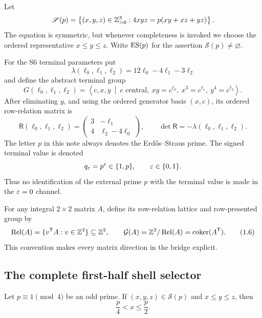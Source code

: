 Let
\[
 \mathscr S(p)=
 \left\{(x,y,z)\in\mathbb Z_{>0}^3:
 4xyz=p(xy+xz+yz)\right\}.
\]
The equation is symmetric, but whenever completeness is invoked we choose the
ordered representative \(x\leq y\leq z\).
Write \(\operatorname{ES}(p)\) for the assertion \(\mathscr S(p)\neq\varnothing\).

For the S6 terminal parameters put
\begin{equation}
 \lambda(\ell_0,\ell_1,\ell_2)
 =12\ell_0-4\ell_1-3\ell_2                 \tag{1.3}
\end{equation}
and define the abstract terminal group
\begin{equation}
 G(\ell_0,\ell_1,\ell_2)=
 \left\langle c,x,y\ \middle|\
 c\text{ central},\ xy=c^{\ell_0},\
 x^3=c^{\ell_1},\ y^4=c^{\ell_2}
 \right\rangle .                            \tag{1.4}
\end{equation}
After eliminating \(y\), and using the ordered generator basis \((x,c)\),
its ordered row-relation matrix is
\begin{equation}
 \mathsf R(\ell_0,\ell_1,\ell_2)=
 \begin{pmatrix}
 3&-\ell_1\\
 4&\ell_2-4\ell_0
 \end{pmatrix},
 \qquad
 \det\mathsf R=-\lambda(\ell_0,\ell_1,\ell_2).              \tag{1.5}
\end{equation}
The letter \(p\) in this note always denotes the Erd\H{o}s--Straus prime.
The signed terminal value is denoted
\[
 q_\varepsilon=p^\varepsilon\in\{1,p\},\qquad \varepsilon\in\{0,1\}.
\]
Thus no identification of the external prime \(p\) with the terminal value
is made in the \(\varepsilon=0\) channel.

For any integral \(2\times2\) matrix \(A\), define its row-relation lattice
and row-presented group by
\[
 \operatorname{Rel}(A)=\{v^{\mathsf T}A:v\in\mathbb Z^2\}\subseteq\mathbb Z^2,
 \qquad \mathcal G(A)=\mathbb Z^2/\operatorname{Rel}(A)=\operatorname{coker}(A^{\mathsf T}).    \tag{1.6}
\]
This convention makes every matrix direction in the bridge explicit.

\subsection{The complete first-half shell selector}

\begin{lemma}\label{lem:esksb-first-half}
Let \(p\equiv1\pmod4\) be an odd prime.  If
\((x,y,z)\in\mathscr S(p)\) and \(x\leq y\leq z\), then
\[
 \frac p4<x\leq\frac p2.
\]
\end{lemma}

